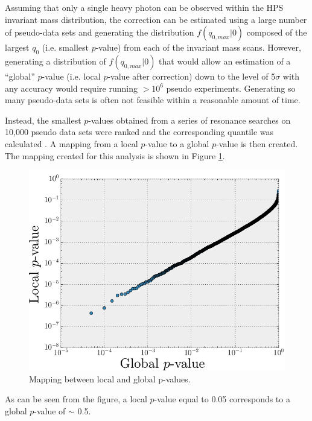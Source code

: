 Assuming that only a single heavy photon can be observed within the HPS invariant
mass distribution, the correction can be estimated using a large number
of pseudo-data sets and generating the distribution 
$f(q_{0, max} | 0)$ composed of the largest $q_{0}$ (i.e. smallest $p$-value)
from each of the invariant mass scans.
However, generating a distribution of $f(q_{0, max} | 0)$ that would allow 
an estimation of a ``global''  
$p$-value (i.e. local $p$-value after correction) down to the level of 5$\sigma$ with any accuracy would 
require running $> 10^{6}$ pseudo experiments.  Generating so many pseudo-data 
sets is often not feasible within a reasonable amount of time. 

Instead, the smallest
$p$-values obtained from a series of resonance searches on 10,000 pseudo
data sets were
ranked and the corresponding quantile was calculated \cite{Gross:2010qma}.  
A mapping from a local 
$p$-value to a global $p$-value is then created.  The mapping created 
for this analysis is shown in Figure \ref{fig:global_p_value}.
\begin{figure}[t]
    \centering
    \includegraphics[width=\textwidth]{images/global_p_value_map.png}
    \caption{Mapping between local and global p-values.}
    \label{fig:global_p_value}
\end{figure}
As can be seen from the figure, a 
local $p$-value equal to 0.05 corresponds to a global $p$-value of $\sim$ 0.5.

